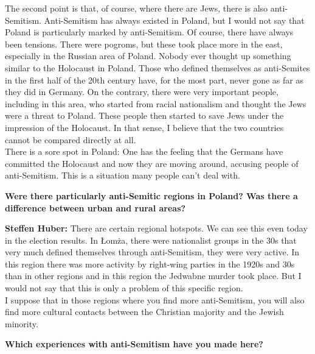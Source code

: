 The second point is that, of course, where there are Jews, there is also anti-Semitism. Anti-Semitism has always existed in Poland, but I would not say that Poland is particularly marked by anti-Semitism. Of course, there have always been tensions. There were pogroms, but these took place more in the east, especially in the Russian area of Poland. Nobody ever thought up something similar to the Holocaust in Poland. Those who defined themselves as anti-Semites in the first half of the 20th century have, for the most part, never gone as far as they did in Germany. On the contrary, there were very important people, including in this area, who started from racial nationalism and thought the Jews were a threat to Poland. These people then started to save Jews under the impression of the Holocaust. In that sense, I believe that the two countries cannot be compared directly at all.\\
There is a sore spot in Poland: One has the feeling that the Germans have committed the Holocaust and now they are moving around, accusing people of anti-Semitism. This is a situation many people can't deal with. 

\textbf{Were there particularly anti-Semitic regions in Poland? Was there a difference between urban and rural areas?} 

\textbf{Steffen Huber:} There are certain regional hotspots. We can see this even today in the election results. In Łomża, there were nationalist groups in the 30s that very much defined themselves through anti-Semitism, they were very active. In this region there was more activity by right-wing parties in the 1920s and 30s than in other regions and in this region the Jedwabne murder took place. But I would not say that this is only a problem of this specific region.\\
I suppose that in those regions where you find more anti-Semitism, you will also find more cultural contacts between the Christian majority and the Jewish minority. 

\textbf{Which experiences with anti-Semitism have you made here? } 


